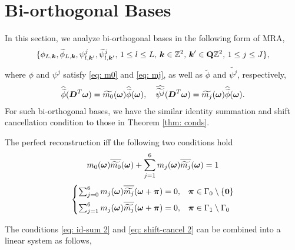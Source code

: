 \section{Bi-orthogonal Bases}\label{sec: bi-orth}
In this section, we analyze bi-orthogonal bases in the following form of MRA,
\begin{align}\label{eq: bi-orth MRA}
\{\phi_{L,\boldsymbol{k}},\widetilde{\phi}_{L,\boldsymbol{k}}, \psi_{l,\boldsymbol{k}'}^j,\widetilde{\psi}_{l,\boldsymbol{k}'}^j,\, 1\leq l\leq L,\,\boldsymbol{k}\in\mathbb{Z}^2,\, \boldsymbol{k}'\in\mathbf{Q}\mathbb{Z}^2,\,1\leq j\leq J \},
\end{align}
where $\phi$ and $\psi^j$ satisfy \eqref{eq: m0} and \eqref{eq: mj}, as well as $\widetilde{\phi}$ and $\widetilde{\psi^j}$, respectively,
\begin{align}\label{eq: mj_dual}
\widehat{\widetilde{\phi}}(\boldsymbol{D}^T\boldsymbol{\omega}) = \widetilde{m_0}(\boldsymbol{\omega})\widehat{\widetilde{\phi}}(\boldsymbol{\omega}),\quad \widehat{\widetilde{\psi^j}}(\boldsymbol{D}^T\boldsymbol{\omega}) = \widetilde{m_j}(\boldsymbol{\omega})\widehat{\widetilde{\phi}}(\boldsymbol{\omega}).
\end{align}
For such bi-orthogonal bases, we have the similar identity summation and shift cancellation condition to those in Theorem \ref{thm: conds}.
\begin{thm}\label{thm: bi-orth conds}
The perfect reconstruction iff the following two conditions hold
\begin{align}\label{eq: id-sum 2}
m_0(\boldsymbol{\omega})\sbarm{0} + \sum_{j = 1}^6 m_j(\boldsymbol{\omega})\sbarm{j} = 1
\end{align}
\begin{equation}\label{eq: shift-cancel 2}
\begin{cases}
\sum_{j = 0}^6m_j(\boldsymbol{\omega})\overlinespace{\widetilde{m_j}}(\boldsymbol{\omega} + \boldsymbol{\pi}) = 0, & \boldsymbol{\pi}\in \Gamma_0\setminus\{\boldsymbol{0}\}\\[.5em]
\sum_{j=1}^6m_j(\boldsymbol{\omega})\overlinespace{\widetilde{m_j}}(\boldsymbol{\omega}+\boldsymbol{\pi}) = 0, & \boldsymbol{\pi}\in\Gamma_1\setminus\Gamma_0
\end{cases}
\end{equation}
\end{thm}
The conditions \eqref{eq: id-sum 2} and \eqref{eq: shift-cancel 2} can be combined into a linear system as follows,
